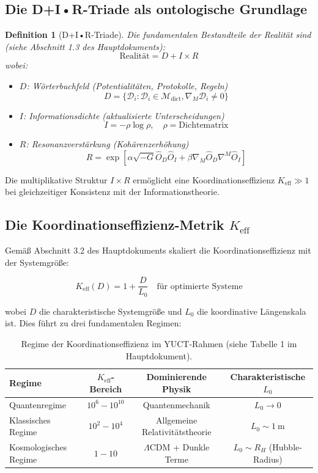 \documentclass[12pt,a4paper]{article}
\newcommand{\Mdict}{\mathcal{M}_{\text{dict}}}
\newcommand{\Dict}{\mathcal{D}}
\newtheorem{definition}[theorem]{Definition}
\theoremstyle{remark}
\newcommand{\Keff}{K_{\mathrm{eff}}}
\begin{document}
	\subsection{Die D+I•R-Triade als ontologische Grundlage}
	
	\begin{definition}[D+I•R-Triade]
		Die fundamentalen Bestandteile der Realität sind (siehe Abschnitt 1.3 des Hauptdokuments):
		\[
		\text{Realität} = D + I \times R
		\]
		wobei:
		\begin{itemize}
			\item $D$: Wörterbuchfeld (Potentialitäten, Protokolle, Regeln)
			\[
			D = \{\Dict_i : \Dict_i \in \Mdict, \nabla_M \Dict_i \neq 0\}
			\]
			\item $I$: Informationsdichte (aktualisierte Unterscheidungen)
			\[
			I = -\rho \log \rho, \quad \rho = \text{Dichtematrix}
			\]
			\item $R$: Resonanzverstärkung (Kohärenzerhöhung)
			\[
			R = \exp\left[\alpha \sqrt{-G} \hat{O}_D \hat{O}_I + \beta \nabla_M\hat{O}_D \nabla^M\hat{O}_I\right]
			\]
		\end{itemize}
	\end{definition}
	
	Die multiplikative Struktur $I \times R$ ermöglicht eine Koordinationseffizienz $\Keff \gg 1$ bei gleichzeitiger Konsistenz mit der Informationstheorie.
	
	\subsection{Die Koordinationseffizienz-Metrik $\Keff$}
	
	Gemäß Abschnitt 3.2 des Hauptdokuments skaliert die Koordinationseffizienz mit der Systemgröße:
	
	\begin{equation}
		\Keff(D) = 1 + \frac{D}{L_0} \quad \text{für optimierte Systeme}
	\end{equation}
	
	wobei $D$ die charakteristische Systemgröße und $L_0$ die koordinative Längenskala ist. Dies führt zu drei fundamentalen Regimen:
	
	\begin{table}[htbp]
		\centering
		\begin{tabular}{lccc}
			\toprule
			\textbf{Regime} & \textbf{$\Keff$-Bereich} & \textbf{Dominierende Physik} & \textbf{Charakteristische $L_0$} \\
			\midrule
			Quantenregime & $10^6 - 10^{10}$ & Quantenmechanik & $L_0 \to 0$ \\
			Klassisches Regime & $10^2 - 10^4$ & Allgemeine Relativitätstheorie & $L_0 \sim 1\ \text{m}$ \\
			Kosmologisches Regime & $1 - 10$ & $\Lambda$CDM + Dunkle Terme & $L_0 \sim R_H$ (Hubble-Radius) \\
			\bottomrule
		\end{tabular}
		\caption{Regime der Koordinationseffizienz im YUCT-Rahmen (siehe Tabelle 1 im Hauptdokument).}
		\label{tab:keff-regimes}
	\end{table}
	
\end{document}
